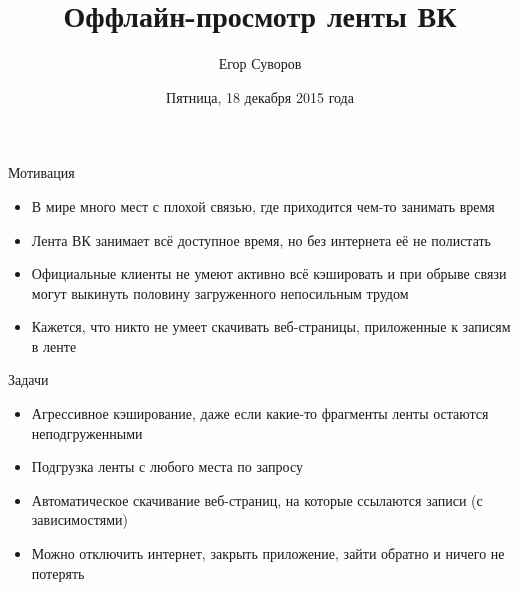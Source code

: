 \documentclass[utf8,xcolor=table]{beamer}
\title{Оффлайн-просмотр ленты ВК}
\author{Егор Суворов}
\institute[СПб АУ]{Практика, осень 2015\\Какой такой куратор?}
\date[18.12.2015]{Пятница, 18 декабря 2015 года}
\begin{document}
\begin{frame}
\titlepage
\end{frame}

\begin{frame}[t]{Мотивация}
	\begin{itemize}
		\item В мире много мест с плохой связью, где приходится чем-то занимать время
		\item Лента ВК занимает всё доступное время, но без интернета её не полистать
		\item Официальные клиенты не умеют активно всё кэшировать и при обрыве связи могут выкинуть половину загруженного непосильным трудом
		\item Кажется, что никто не умеет скачивать веб-страницы, приложенные к записям в ленте
	\end{itemize}
\end{frame}

\begin{frame}[t]{Задачи}
	\begin{itemize}
		\item Агрессивное кэширование, даже если какие-то фрагменты ленты остаются неподгруженными
		\item Подгрузка ленты с любого места по запросу
		\item Автоматическое скачивание веб-страниц, на которые ссылаются записи (с зависимостями)
		\item Можно отключить интернет, закрыть приложение, зайти обратно и ничего не потерять
	\end{itemize}
\end{frame}
\end{document}
